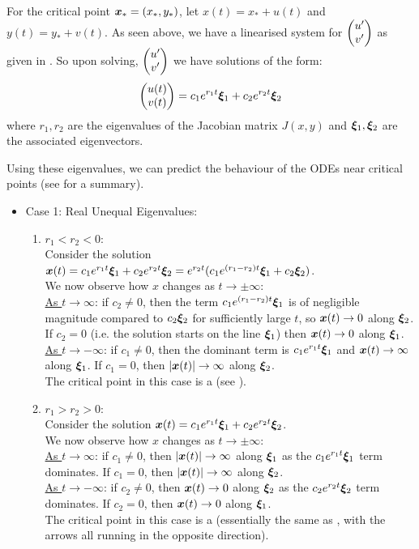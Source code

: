 For the critical point $\bm{x}_{\ast} = (x_{\ast}, y_{\ast})$, let $x(t) = x_{\ast} + u(t)$ and $y(t) = y_{\ast} + v(t)$. As seen above, we have a linearised system for $\begin{pmatrix}u'\\v'\end{pmatrix}$ as given in . So upon solving, $\begin{pmatrix}u'\\v'\end{pmatrix}$ we have solutions of the form: 
\begin{equation}\label{3.5}
	\begin{pmatrix}u(t)\\v(t)\end{pmatrix} = 
	c_1 e^{r_1t} \bm{\xi}_1 + c_2 e^{r_2t} \bm{\xi}_2
\end{equation}
where $r_1, r_2$ are the eigenvalues of the Jacobian matrix $J(x,y)$ and $\bm{\xi}_1, \bm{\xi}_2$ are the associated eigenvectors.

Using these eigenvalues, we can predict the behaviour of the ODEs near critical points (see  for a summary).
\begin{itemize}
	\item Case 1: Real Unequal Eigenvalues:
	\begin{enumerate}[label=(\roman*)]
		\item $r_1 < r_2 < 0$: \\
		Consider the solution $\bm{x}(t) = c_1 e^{r_1t} \bm{\xi}_1 + c_2 e^{r_2t} \bm{\xi}_2 = e^{r_2t} (c_1 e^{(r_1-r_2)t} \bm{\xi}_1 + c_2 \bm{\xi}_2)$. \\
		We now observe how $x$ changes as $t \to \pm \infty$: \\
		\underline{As $t \to \infty$}: if $c_2 \neq 0$, then the term $c_1 e^{(r_1-r_2)t} \bm{\xi}_1$ is of negligible magnitude compared to $c_2 \bm{\xi}_2$ for sufficiently large $t$, so $\bm{x}(t) \to 0$ along $\bm{\xi}_2$.
		If $c_2 = 0$ (i.e. the solution starts on the line $\bm{\xi}_1$) then $\bm{x}(t) \to 0$ along $\bm{\xi}_1$. \\
		\underline{As $t \to -\infty$}: if $c_1 \neq 0$, then the dominant term is $c_1 e^{r_1t} \bm{\xi}_1$ and $\bm{x}(t) \to \infty$ along $\bm{\xi}_1$. 
		If $c_1 = 0$, then $|\bm{x}(t)| \to \infty$ along $\bm{\xi}_2$. \\
		The critical point in this case is a  (see ).
		
		\item $r_1 > r_2 > 0$: \\
		Consider the solution $\bm{x}(t) = c_1 e^{r_1t} \bm{\xi}_1 + c_2 e^{r_2t} \bm{\xi}_2$. \\
		We now observe how $x$ changes as $t \to \pm \infty$: \\
		\underline{As $t \to \infty$}: if $c_1 \neq 0$, then $|\bm{x}(t)| \to \infty$ along $\bm{\xi}_1$ as the $c_1 e^{r_1t} \bm{\xi}_1$ term dominates.
		If $c_1 = 0$, then $|\bm{x}(t)| \to \infty$ along $\bm{\xi}_2$. \\
		\underline{As $t \to -\infty$}: if $c_2 \neq 0$, then $\bm{x}(t) \to 0$ along $\bm{\xi}_2$ as the $c_2 e^{r_2t} \bm{\xi}_2$ term dominates.  
		If $c_2 = 0$, then $\bm{x}(t) \to 0$ along $\bm{\xi}_1$. \\
		The critical point in this case is a  (essentially the same as , with the arrows all running in the opposite direction).
		

\end{enumerate}
\end{itemize}
